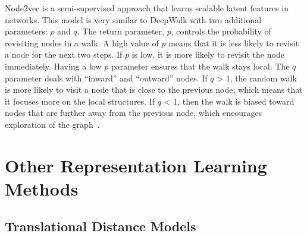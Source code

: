 Node2vec is a semi-supervised approach that learns scalable latent features in networks.
This model is very similar to DeepWalk with two additional parameters: $p$ and $q$.
The return parameter, $p$, controls the probability of revisiting nodes in a walk.
A high value of $p$ means that it is less likely to revisit a node for the next two steps.
If $p$ is low, it is more likely to revisit the node immediately.
Having a low $p$ parameter ensures that the walk stays local.
The $q$ parameter deals with “inward” and “outward” nodes.
If $q$ > 1, the random walk is more likely to visit a node that is close to the previous node, which means that it focuses more on the local structures.
If $q$ < 1, then the walk is biased toward nodes that are further away from the previous node, which encourages exploration of the graph~\cite{grover_node2vec:_2016}.

\begin{figure}[h!]
\end{figure}
\section{Other Representation Learning Methods}

\subsection{Translational Distance Models}

